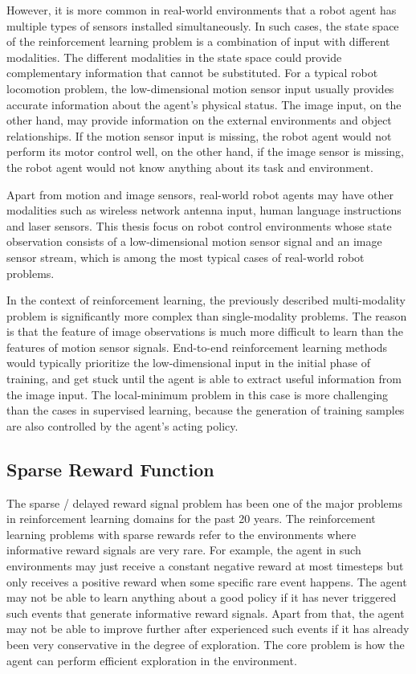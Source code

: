 However, it is more common in real-world environments that a robot agent has multiple types of sensors installed simultaneously. In such cases, the state space of the reinforcement learning problem is a combination of input with different modalities. The different modalities in the state space could provide complementary information that cannot be substituted. For a typical robot locomotion problem, the low-dimensional motion sensor input usually provides accurate information about the agent's physical status. The image input, on the other hand, may provide information on the external environments and object relationships. If the motion sensor input is missing, the robot agent would not perform its motor control well, on the other hand, if the image sensor is missing, the robot agent would not know anything about its task and environment.


Apart from motion and image sensors, real-world robot agents may have other modalities such as wireless network antenna input, human language instructions and laser sensors. This thesis focus on robot control environments whose state observation consists of a low-dimensional motion sensor signal and an image sensor stream, which is among the most typical cases of real-world robot problems.

In the context of reinforcement learning, the previously described multi-modality problem is significantly more complex than single-modality problems. The reason is that the feature of image observations is much more difficult to learn than the features of motion sensor signals. End-to-end reinforcement learning methods would typically prioritize the low-dimensional input in the initial phase of training, and get stuck until the agent is able to extract useful information from the image input. The local-minimum problem in this case is more challenging than the cases in supervised learning, because the generation of training samples are also controlled by the agent's acting policy.

\subsection{Sparse Reward Function}
The sparse / delayed reward signal problem has been one of the major problems in reinforcement learning domains for the past 20 years. The reinforcement learning problems with sparse rewards refer to the environments where informative reward signals are very rare. For example, the agent in such environments may just receive a constant negative reward at most timesteps but only receives a positive reward when some specific rare event happens. The agent may not be able to learn anything about a good policy if it has never triggered such events that generate informative reward signals. Apart from that, the agent may not be able to improve further after experienced such events if it has already been very conservative in the degree of exploration. The core problem is how the agent can perform efficient exploration in the environment.

